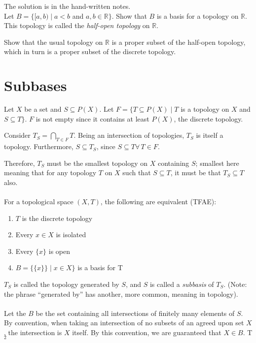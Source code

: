 \documentclass[12pt]{report}
\newcommand{\exercise}{ \noindent{\sc Exercise }\hspace{5pt} }
\newcommand{\define}{  \noindent{\sc Definition }\hspace{5pt} }
\newcommand{\fall}{\forall\,}
\newcommand{\intover}[2]{\bigcap_{#1 \in #2}}
\newcommand{\reals}{\mathbb{R}}
\begin{document}
The solution is in the hand-written notes.
\\

\exercise Let $B = \{[a,b) \mid a < b$ and $a,b \in \reals\}$. Show that $B$ is
a basis for a topology on $\reals$. This topology is called the
 {\em half-open topology} on $\reals$.

Show that the usual topology on $\reals$ is a proper subset of the half-open
topology, which in turn is a proper subset of the discrete topology.

\section{Subbases}

Let $X$ be a set and $S \subseteq P(X)$. Let 
$F = \{T \subseteq P(X) \mid T$ is a topology on $X$ and $S \subseteq T\}$.
$F$ is not empty since it contains at least $P(X)$, the discrete topology.

Consider $T_S = \intover{T}{F}T$. Being an intersection of topologies, $T_S$
is itself a topology. Furthermore, $S \subseteq T_S$, since $S \subseteq T
\fall T \in F$. 

Therefore, $T_S$ must be the smallest topology on $X$ containing $S$; smallest
here meaning that for any topology $T$ on $X$ such that $S \subseteq T$, it
must be that $T_S \subseteq T$ also.\\
\\
\exercise For a topological space $(X,T)$, the following are equivalent
(TFAE):
\begin{enumerate}
\item $T$ is the discrete topology
\item Every $x \in X$ is isolated
\item Every $\{x\}$ is open
\item $B = \{ \{x\} \} \mid x \in X \}$ is a basis for T
\end{enumerate}
\define $T_S$ is called the topology generated by $S$, and $S$ is called a
 {\em subbasis} of $T_S$. (Note: the phrase ``generated by''
has another, more common, meaning in topology).\\
\\
Let the  $B$ be the set containing all intersections of finitely many elements of
$S$. By convention, when taking an intersection of no subsets of an agreed
upon set $X$, the intersection is $X$ itself. By this convention, we are
guaranteed that $X \in B$. T$_2$
\end{document}
